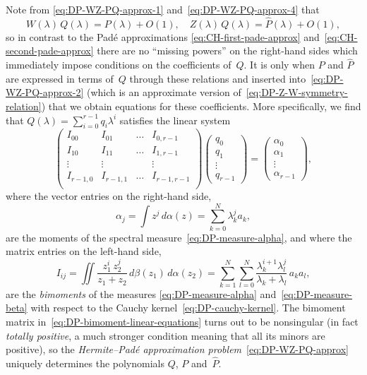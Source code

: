 \documentclass[10pt,a4paper]{article} \pdfoutput=1 
\begin{document}
Note from \eqref{eq:DP-WZ-PQ-approx-1} and~\eqref{eq:DP-WZ-PQ-approx-4} that
\begin{equation*}
  W(\lambda) \, Q(\lambda) = P(\lambda) + O(1)
  ,\quad
  Z(\lambda) \, Q(\lambda) = \widehat P(\lambda) + O(1)
  ,
\end{equation*}
so in contrast to the Padé approximations \eqref{eq:CH-first-pade-approx}
and~\eqref{eq:CH-second-pade-approx}
there are no ``missing powers'' on the right-hand sides which immediately impose
conditions on the coefficients of~$Q$.
It is only when $P$ and $\widehat P$ are expressed in terms of~$Q$ through these relations
and inserted into~\eqref{eq:DP-WZ-PQ-approx-2}
(which is an approximate version of~\eqref{eq:DP-Z-W-symmetry-relation})
that we obtain equations for these coefficients.
More specifically, we find that $Q(\lambda)=\sum_{i=0}^{r-1} q_i \lambda^i$
satisfies the linear system
\begin{equation}
  \label{eq:DP-bimoment-linear-equations}
  \begin{pmatrix}
    I_{00} & I_{01} & \dots & I_{0,r-1} \\
    I_{10} & I_{11} & \dots & I_{1,r-1} \\
    \vdots & \vdots & & \vdots \\
    I_{r-1,0} & I_{r-1,1} & \dots & I_{r-1,r-1} \\
  \end{pmatrix}
  \begin{pmatrix}
    q_0 \\ q_1 \\ \vdots \\ q_{r-1}
  \end{pmatrix}
  =
  \begin{pmatrix}
    \alpha_0 \\ \alpha_1 \\ \vdots \\ \alpha_{r-1}
  \end{pmatrix},
\end{equation}
where the vector entries on the right-hand side,
\begin{equation}
  \alpha_j = \int z^j \, d\alpha(z)
  = \sum_{k=0}^N \lambda_k^j a_k
  ,
\end{equation}
are the moments of the spectral measure~\eqref{eq:DP-measure-alpha},
and where the matrix entries on the left-hand side,
\begin{equation}
  I_{ij} = \iint \frac{z_1^{i} \, z_2^j}{z_1+z_2} \, d\beta(z_1) \, d\alpha(z_2)
  = \sum_{k=1}^N \sum_{l=0}^N \frac{\lambda_k^{i+1} \lambda_l^j}{\lambda_k + \lambda_l} \, a_k a_l
  ,
\end{equation}
are the \emph{bimoments} of the measures \eqref{eq:DP-measure-alpha} and~\eqref{eq:DP-measure-beta}
with respect to the Cauchy kernel~\eqref{eq:DP-cauchy-kernel}.
The bimoment matrix in~\eqref{eq:DP-bimoment-linear-equations}
turns out to be nonsingular
(in fact \emph{totally positive}, a much stronger condition meaning that all its minors are positive),
so the \emph{Hermite--Padé approximation problem}~\eqref{eq:DP-WZ-PQ-approx}
uniquely determines the polynomials $Q$, $P$ and~$\widehat P$.
\end{document}
